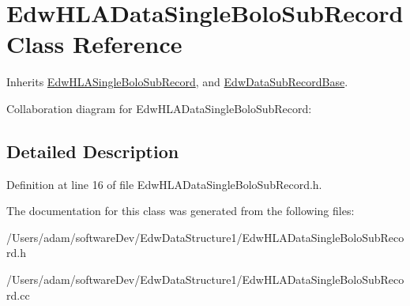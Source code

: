 \hypertarget{class_edw_h_l_a_data_single_bolo_sub_record}{
\section{EdwHLADataSingleBoloSubRecord Class Reference}
\label{class_edw_h_l_a_data_single_bolo_sub_record}
}


Inherits \hyperlink{class_edw_h_l_a_single_bolo_sub_record}{EdwHLASingleBoloSubRecord}, and \hyperlink{class_edw_data_sub_record_base}{EdwDataSubRecordBase}.



Collaboration diagram for EdwHLADataSingleBoloSubRecord:

\subsection{Detailed Description}


Definition at line 16 of file EdwHLADataSingleBoloSubRecord.h.



The documentation for this class was generated from the following files:\begin{DoxyCompactItemize}
\item 
/Users/adam/softwareDev/EdwDataStructure1/EdwHLADataSingleBoloSubRecord.h\item 
/Users/adam/softwareDev/EdwDataStructure1/EdwHLADataSingleBoloSubRecord.cc\end{DoxyCompactItemize}
